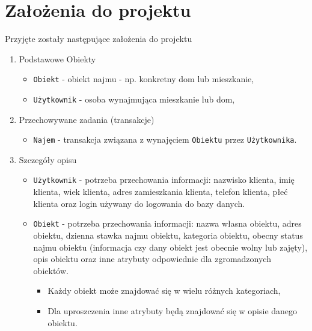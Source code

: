 \section{Założenia do projektu}

Przyjęte zostały następujące założenia do projektu
\begin{enumerate}

	\item Podstawowe Obiekty
	\begin{itemize}
		\item \texttt{Obiekt} - obiekt najmu - np. konkretny dom lub mieszkanie,
		\item \texttt{Użytkownik} - osoba wynajmująca mieszkanie lub dom,
	\end{itemize}

	\item Przechowywane zadania (transakcje)
	\begin{itemize}
		\item \texttt{Najem} - transakcja związana z wynajęciem \texttt{Obiektu} przez \texttt{Użytkownika}.
	\end{itemize}
	
	\item Szczegóły opisu
	\begin{itemize}
		\item \texttt{Użytkownik} - potrzeba przechowania informacji: nazwisko klienta, imię klienta, wiek klienta, adres zamieszkania klienta, telefon klienta, płeć klienta oraz login używany do logowania do bazy danych.

		\item \texttt{Obiekt} - potrzeba przechowania informacji: nazwa własna obiektu, adres obiektu, dzienna stawka najmu obiektu, kategoria obiektu, obecny status najmu obiektu (informacja czy dany obiekt jest obecnie wolny lub zajęty), opis obiektu oraz inne atrybuty odpowiednie dla zgromadzonych obiektów.
		\begin{itemize}
			\item Każdy obiekt może znajdować się w wielu różnych kategoriach,
			\item Dla uproszczenia inne atrybuty będą znajdować się w opisie danego obiektu.
		\end{itemize}
		

\end{itemize}
\end{enumerate}
